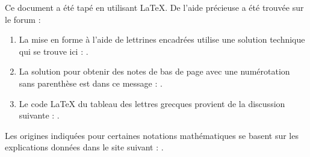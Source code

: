 
Ce document a été tapé en utilisant \LaTeX{}. De l'aide précieuse a été trouvée sur le forum  :

\begin{enumerate}
    \item La mise en forme à l'aide de lettrines encadrées utilise une solution technique qui se trouve ici : .

    \item La solution pour obtenir des notes de bas de page avec une numérotation sans parenthèse est dans ce message : .

    \item Le code \LaTeX{} du tableau des lettres grecques provient de la discussion suivante : .

\end{enumerate}

\noindent Les origines indiquées pour certaines notations mathématiques se basent sur les explications données dans le site suivant : .
